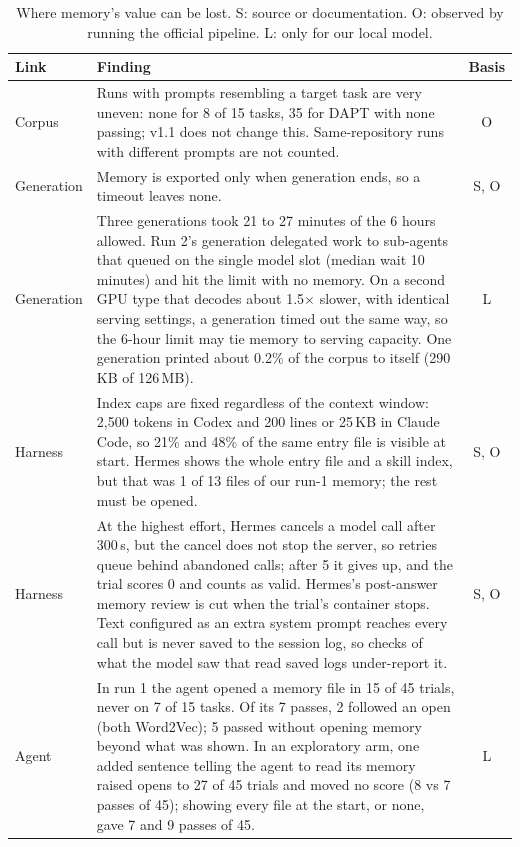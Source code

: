 \begin{table}[t]
\centering
\caption{Where memory's value can be lost. S: source or documentation. O: observed by running the official pipeline. L: only for our local model.}
\label{tab:chain}
\footnotesize
\begin{tabular}{@{}p{}p{}c@{}}
\toprule
Link & Finding & Basis \\
\midrule
Corpus & Runs with prompts resembling a target task are very uneven: none for 8 of 15 tasks, 35 for DAPT with none passing; v1.1 does not change this. Same-repository runs with different prompts are not counted. & O \\
Generation & Memory is exported only when generation ends, so a timeout leaves none. & S, O \\
Generation & Three generations took 21 to 27 minutes of the 6 hours allowed. Run 2's generation delegated work to sub-agents that queued on the single model slot (median wait 10 minutes) and hit the limit with no memory. On a second GPU type that decodes about 1.5$\times$ slower, with identical serving settings, a generation timed out the same way, so the 6-hour limit may tie memory to serving capacity. One generation printed about 0.2\% of the corpus to itself (290\,KB of 126\,MB). & L \\
Harness & Index caps are fixed regardless of the context window: 2{,}500 tokens in Codex and 200 lines or 25\,KB in Claude Code, so 21\% and 48\% of the same entry file is visible at start. Hermes shows the whole entry file and a skill index, but that was 1 of 13 files of our run-1 memory; the rest must be opened. & S, O \\
Harness & At the highest effort, Hermes cancels a model call after 300\,s, but the cancel does not stop the server, so retries queue behind abandoned calls; after 5 it gives up, and the trial scores 0 and counts as valid. Hermes's post-answer memory review is cut when the trial's container stops. Text configured as an extra system prompt reaches every call but is never saved to the session log, so checks of what the model saw that read saved logs under-report it. & S, O \\
Agent & In run 1 the agent opened a memory file in 15 of 45 trials, never on 7 of 15 tasks. Of its 7 passes, 2 followed an open (both Word2Vec); 5 passed without opening memory beyond what was shown. In an exploratory arm, one added sentence telling the agent to read its memory raised opens to 27 of 45 trials and moved no score (8 vs 7 passes of 45); showing every file at the start, or none, gave 7 and 9 passes of 45. & L \\

\end{tabular}
\end{table}
